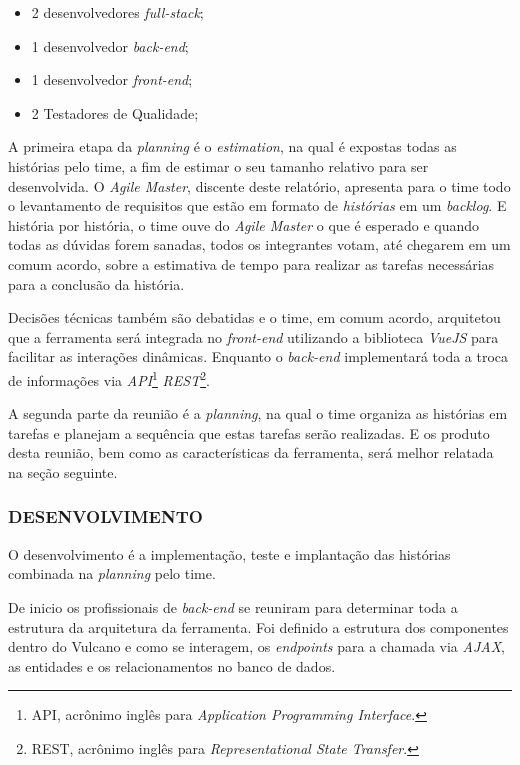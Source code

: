 \documentclass[
  12pt,            %
  openany,
  oneside,
  a4paper,         %
  english,      %
  brazil
]{article}
\numberwithin{figure}{section}
\numberwithin{table}{section}
\begin{document}
\vspace{-10mm}
\begin{singlespace}
  \begin{itemize}
    \item 2 desenvolvedores \textit{full-stack};
    \item 1 desenvolvedor \textit{back-end};
    \item 1 desenvolvedor \textit{front-end};
    \item 2 Testadores de Qualidade;
  \end{itemize}
\end{singlespace}
\vspace{-5mm}

A primeira etapa da \textit{planning} é o \textit{estimation}, na qual é expostas todas as histórias pelo time, a fim de estimar o seu tamanho relativo para ser desenvolvida. O \textit{Agile Master}, discente deste relatório, apresenta para o time todo o levantamento de requisitos que estão em formato de \textit{histórias} em um \textit{backlog}. E história por história, o time ouve do \textit{Agile Master} o que é esperado e quando todas as dúvidas forem sanadas, todos os integrantes votam, até chegarem em um comum acordo, sobre a estimativa de tempo para realizar as tarefas necessárias para a conclusão da história.

Decisões técnicas também são debatidas e o time, em comum acordo, arquitetou que a ferramenta será integrada no \textit{front-end} utilizando a biblioteca \textit{VueJS} para facilitar as interações dinâmicas. Enquanto o \textit{back-end} implementará toda a troca de informações via \textit{API}\footnote{API, acrônimo inglês para \textit{Application Programming Interface}.} \textit{REST}\footnote{REST, acrônimo inglês para \textit{Representational State Transfer}.}.

A segunda parte da reunião é a \textit{planning}, na qual o time organiza as histórias em tarefas e planejam a sequência que estas tarefas serão realizadas. E os produto desta reunião, bem como as características da ferramenta, será melhor relatada na seção seguinte.


\subsubsection{DESENVOLVIMENTO}

O desenvolvimento é a implementação, teste e implantação das histórias combinada na \textit{planning} pelo time.

De inicio os profissionais de \textit{back-end} se reuniram para determinar toda a estrutura da arquitetura da ferramenta. Foi definido a estrutura dos componentes dentro do Vulcano e como se interagem, os \textit{endpoints} para a chamada via \textit{AJAX}, as entidades e os relacionamentos no banco de dados.
\end{document}
